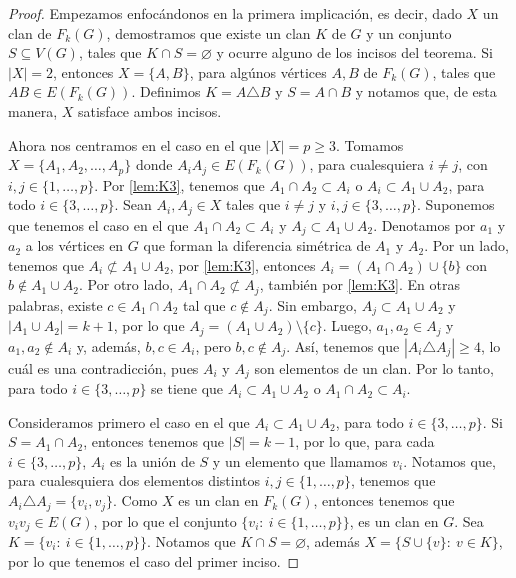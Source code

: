 \begin{proof}
    Empezamos enfoc\'andonos en la primera implicaci\'on, es decir, dado $X$ un
    clan de $F_k(G)$, demostramos que existe un clan $K$ de $G$ y un conjunto $S
    \subseteq V(G)$, tales que $K \cap S = \varnothing$ y ocurre alguno de los
    incisos del teorema. Si $|X|=2$, entonces $X= \{A, B\}$, para alg\'unos
    v\'ertices $A, B$ de $F_k(G)$, tales que $AB \in E(F_k(G))$. Definimos $K =
    A \triangle B$ y $S=A \cap B$ y notamos que, de esta manera, $X$ satisface
    ambos incisos.

    Ahora nos centramos en el caso en el que $|X|= p \geq 3$. Tomamos $X=\{A_1,
    A_2, \dots, A_p\}$ donde $A_i{A_j} \in E(F_k(G))$, para cualesquiera $i\neq
    j$, con $i,j \in \{1, \dots, p\}$. Por \cref{lem:K3}, tenemos que $A_1\cap
    A_2 \subset A_i$ o $A_i \subset A_1 \cup A_2$, para todo $i \in \{3, \dots,
    p \}$. Sean $A_i, A_j \in X$ tales que $i \neq j$ y $i, j \in \{3, \dots,
    p\}$. Suponemos que tenemos el caso en el que $A_1\cap A_2 \subset A_i$ y
    $A_j \subset A_1 \cup A_2$. Denotamos por $a_1$ y $a_2$ a los v\'ertices en
    $G$ que forman la diferencia sim\'etrica de $A_1$ y $A_2$. Por un lado,
    tenemos que $A_i \not\subset A_1\cup A_2$, por \cref{lem:K3}, entonces $A_i
    = (A_1\cap A_2) \cup \{b\}$ con $b \notin A_1\cup A_2$. Por otro lado, $A_1
    \cap A_2 \not\subset A_j$, tambi\'en por \cref{lem:K3}. En otras palabras,
    existe $c \in A_1 \cap A_2$ tal que $c \notin A_j$. Sin embargo, $A_j
    \subset A_1 \cup A_2$ y $|A_1 \cup A_2| =k+1$, por lo que $A_j = (A_1 \cup
    A_2)\setminus \{c\}$. Luego, $a_1, a_2 \in A_j$ y $a_1, a_2 \notin A_i$ y,
    adem\'as, $b, c \in A_i$, pero $b, c \notin A_j$. As\'i, tenemos que $|A_i
    \triangle A_j| \geq 4$, lo cu\'al es una contradicci\'on, pues $A_i$ y $A_j$
    son elementos de un clan. Por lo tanto, para todo $i\in \{3, \dots, p\}$ se
    tiene que $A_i \subset A_1\cup A_2$ o $A_1 \cap A_2 \subset A_i$.

    Consideramos primero el caso en el que $A_i \subset A_1\cup A_2$, para todo
    $i\in \{3, \dots, p\}$. Si $S= A_1 \cap A_2$, entonces tenemos que $|S|
    =k-1$, por lo que, para cada $i \in \{3, \dots, p\}$, $A_i$ es la uni\'on de
    $S$ y un elemento que llamamos $v_i$. Notamos que, para cualesquiera dos
    elementos distintos $i, j \in \{1, \dots, p\}$, tenemos que $A_i \triangle
    A_j = \{v_i, v_j\}$. Como $X$ es un clan en $F_k(G)$, entonces tenemos que
    $v_i{v_j} \in E(G)$, por lo que el conjunto $\{v_i\colon\ i \in \{1, \dots,
    p\}\}$, es un clan en $G$.   Sea $K = \{v_i\colon\ i \in \{1, \dots, p\}\}$.
    Notamos que  $K \cap S = \varnothing$, adem\'as $X= \{S \cup \{v\}\colon\ v
    \in K\}$, por lo que tenemos el caso del primer inciso.


\end{proof}
